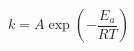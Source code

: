 \documentclass[preview]{standalone}
\begin{document}
\[k = A \exp\left(-\frac{E_a}{RT}\right) \tag{2.2}\]
\end{document}
